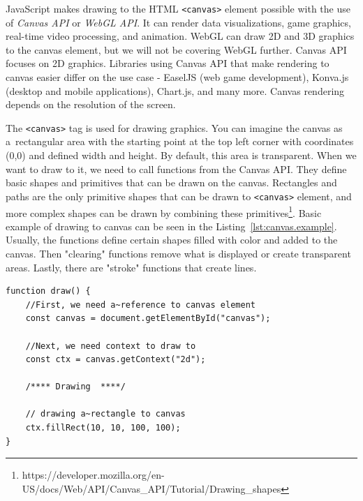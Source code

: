 JavaScript makes drawing to the HTML \verb|<canvas>| element possible with the use of \textit{Canvas API} or \textit{WebGL API}. It can render data visualizations, game graphics, real-time video processing, and animation. WebGL can draw 2D and 3D graphics to the canvas element, but we will not be covering WebGL further. Canvas API focuses on 2D graphics. Libraries using Canvas API that make rendering to canvas easier differ on the use case - EaselJS (web game development), Konva.js (desktop and mobile applications), Chart.js, and many more. Canvas rendering depends on the resolution of the screen. 

The \verb|<canvas>| tag is used for drawing graphics. You can imagine the canvas as a~rectangular area with the starting point at the top left corner with coordinates (0,0) and defined width and height. By default, this area is transparent. When we want to draw to it, we need to call functions from the Canvas API. They define basic shapes and primitives that can be drawn on the canvas. Rectangles and paths are the only primitive shapes that can be drawn to \verb|<canvas>| element, and more complex shapes can be drawn by combining these primitives\footnote{https://developer.mozilla.org/en-US/docs/Web/API/Canvas\_API/Tutorial/Drawing\_shapes}. Basic example of drawing to canvas can be seen in the Listing~\ref{lst:canvas.example}. Usually, the functions define certain shapes filled with color and added to the canvas. Then "clearing" functions remove what is displayed or create transparent areas. Lastly, there are "stroke" functions that create lines. 


\begin{lstlisting}[style=htmlcssjs,label=lst:canvas.example,caption={D3js x-axis implementation.}]
function draw() {
    //First, we need a~reference to canvas element
    const canvas = document.getElementById("canvas");

    //Next, we need context to draw to
    const ctx = canvas.getContext("2d");

    /**** Drawing  ****/
    
    // drawing a~rectangle to canvas
    ctx.fillRect(10, 10, 100, 100);
}
\end{lstlisting}

